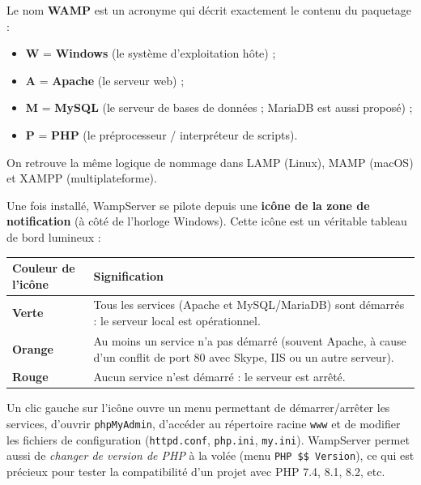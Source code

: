 \documentclass[11pt]{article}
\begin{document}
\begin{exemplebox}
Le nom \textbf{WAMP} est un acronyme qui décrit exactement le contenu du paquetage :
\begin{itemize}
\item \textbf{W} = \textbf{Windows} (le système d'exploitation hôte) ;
\item \textbf{A} = \textbf{Apache} (le serveur web) ;
\item \textbf{M} = \textbf{MySQL} (le serveur de bases de données ; MariaDB est aussi proposé) ;
\item \textbf{P} = \textbf{PHP} (le préprocesseur / interpréteur de scripts).
\end{itemize}
On retrouve la même logique de nommage dans LAMP (Linux), MAMP (macOS) et XAMPP (multiplateforme).
\end{exemplebox}

Une fois installé, WampServer se pilote depuis une \textbf{icône de la zone de notification} (à côté de l'horloge Windows). Cette icône est un véritable tableau de bord lumineux :

\begin{center}
\begin{tabularx}{\linewidth}{|l|X|}
\hline
\rowcolor{popblueL} \textbf{Couleur de l'icône} & \textbf{Signification} \\
\hline
\textcolor{popgreen}{\textbf{Verte}} & Tous les services (Apache et MySQL/MariaDB) sont démarrés : le serveur local est opérationnel. \\
\hline
\textcolor{poporange}{\textbf{Orange}} & Au moins un service n'a pas démarré (souvent Apache, à cause d'un conflit de port 80 avec Skype, IIS ou un autre serveur). \\
\hline
\textcolor{poppink}{\textbf{Rouge}} & Aucun service n'est démarré : le serveur est arrêté. \\
\hline
\end{tabularx}
\end{center}

Un clic gauche sur l'icône ouvre un menu permettant de démarrer/arrêter les services, d'ouvrir \texttt{phpMyAdmin}, d'accéder au répertoire racine \texttt{www} et de modifier les fichiers de configuration (\texttt{httpd.conf}, \texttt{php.ini}, \texttt{my.ini}). WampServer permet aussi de \emph{changer de version de PHP} à la volée (menu \texttt{PHP \$\rightarrow\$ Version}), ce qui est précieux pour tester la compatibilité d'un projet avec PHP 7.4, 8.1, 8.2, etc.
\end{document}
